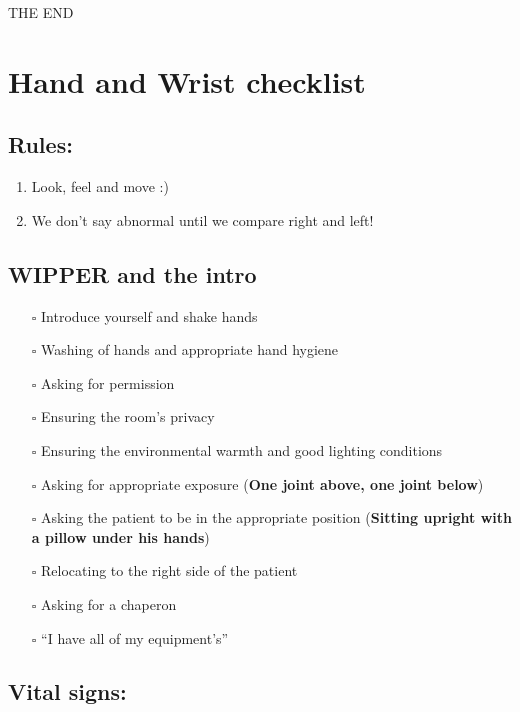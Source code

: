 \documentclass[
  13.5pt,
  a4paper,
  DIV=11,
  numbers=noendperiod]{scrreprt}
\providecommand{\tightlist}{%
  \setlength{\itemsep}{0pt}\setlength{\parskip}{0pt}}
\begin{document}
THE END


\chapter{Hand and Wrist checklist}\label{hand-and-wrist-checklist}

\section{Rules:}\label{rules}

\begin{enumerate}
\def\labelenumi{\arabic{enumi}.}
\tightlist
\item
  Look, feel and move :)
\item
  We don't say abnormal until we compare right and left!
\end{enumerate}

\section{WIPPER and the intro}\label{wipper-and-the-intro-5}

\begin{itemize}
\tightlist
\item[$\square$]
  Introduce yourself and shake hands
\item[$\square$]
  Washing of hands and appropriate hand hygiene
\item[$\square$]
  Asking for permission
\item[$\square$]
  Ensuring the room's privacy
\item[$\square$]
  Ensuring the environmental warmth and good lighting conditions
\item[$\square$]
  Asking for appropriate exposure (\textbf{One joint above, one joint
  below})
\item[$\square$]
  Asking the patient to be in the appropriate position (\textbf{Sitting
  upright with a pillow under his hands})
\item[$\square$]
  Relocating to the right side of the patient
\item[$\square$]
  Asking for a chaperon
\item[$\square$]
  ``I have all of my equipment's''
\end{itemize}

\section{Vital signs:}\label{vital-signs-5}
\end{document}
